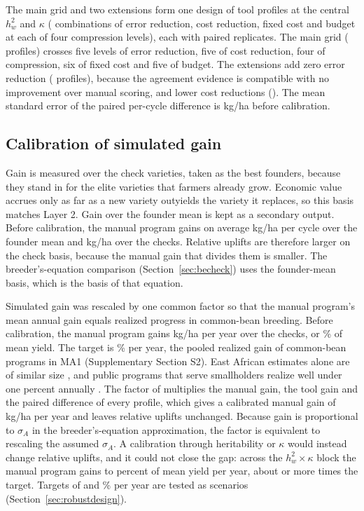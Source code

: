 The main grid and two extensions form one design of \NumNcellsOK{} tool profiles at the central $h^2_w$ and $\kappa$ (\NumNgridTech{} combinations of error reduction, cost reduction, fixed cost and budget at each of four compression levels), each with \NumNrepsPerCell{} paired replicates. The main grid (\NumNcellsMain{} profiles) crosses five levels of error reduction, five of cost reduction, four of compression, six of fixed cost and five of budget. The extensions add zero error reduction (\NumNcellsExtA{} profiles), because the agreement evidence is compatible with no improvement over manual scoring, and lower cost reductions (\NumNcellsExtB). The mean standard error of the paired per-cycle difference is \NumDGdiffSE{} kg/ha before calibration.

\subsection{Calibration of simulated gain}
\label{sec:calibration}

Gain is measured over the check varieties, taken as the best founders, because they stand in for the elite varieties that farmers already grow. Economic value accrues only as far as a new variety outyields the variety it replaces, so this basis matches Layer 2. Gain over the founder mean is kept as a secondary output. Before calibration, the manual program gains on average \NumDGvsBaseTradPerCycle{} kg/ha per cycle over the founder mean and \NumDGtradPerCycle{} kg/ha over the checks. Relative uplifts are therefore larger on the check basis, because the manual gain that divides them is smaller. The breeder's-equation comparison (Section~\ref{sec:becheck}) uses the founder-mean basis, which is the basis of that equation.

Simulated gain was rescaled by one common factor so that the manual program's mean annual gain equals realized progress in common-bean breeding. Before calibration, the manual program gains \NumDGtradPerYear{} kg/ha per year over the checks, or \NumDGtradPctPerYearRaw\% of mean yield. The target is \NumGainTargetPct\% per year, the pooled realized gain of common-bean programs in MA1 (Supplementary Section S2). East African estimates alone are of similar size \citep{Amongi2023Gain}, and public programs that serve smallholders realize well under one percent annually \citep{Cobb2019Enhancing}. The factor of \NumGainScale{} multiplies the manual gain, the tool gain and the paired difference of every profile, which gives a calibrated manual gain of \NumDGtradPerYearCal{} kg/ha per year and leaves relative uplifts unchanged. Because gain is proportional to $\sigma_A$ in the breeder's-equation approximation, the factor is equivalent to rescaling the assumed $\sigma_A$. A calibration through heritability or $\kappa$ would instead change relative uplifts, and it could not close the gap: across the $h^2_w \times \kappa$ block the manual program gains \NumRobManualGainPctMin{} to \NumRobManualGainPctMax{} percent of mean yield per year, about \NumRobManualGainFoldMin{} or more times the target. Targets of \NumCfgTargetLow{} and \NumCfgTargetHigh\% per year are tested as scenarios (Section~\ref{sec:robustdesign}).

